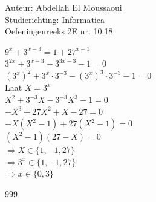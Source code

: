 \documentclass[a4paper]{article}
\begin{document}
  
\noindent \large Auteur: Abdellah El Moussaoui \\
\noindent \large Studierichting: Informatica\\
\noindent \large Oefeningenreeks 2E nr. 10.18\\

\medskip

\normalsize


$9^x+3^{x-3}=1+27^{x-1}$\\

$3^{2x}+3^{x-3}-3^{3x-3}-1=0$\\

$\left(3^x\right)^2+3^x\cdot3^{-3}-\left(3^x\right)^3\cdot3^{-3}-1=0$\\

Laat $X=3^x$\\

$X^2+3^{-3}X-3^{-3}X^3-1=0$\\

$-X^3+27X^2+X-27=0$\\

$-X\left(X^2-1\right)+27\left(X^2-1\right)=0$\\

$\left(X^2-1\right)\left(27-X\right)=0$\\

$\Rightarrow X \in \{1,-1,27\}$\\

$\Rightarrow 3^x \in \{1,-1,27\}$\\

$\Rightarrow \boxed{x \in \{0, 3\}}$\\




\begin{thebibliography}{999}
\end{thebibliography}
\end{document}
